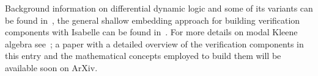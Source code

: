 \documentclass[11pt,a4paper]{article}
\begin{document}
Background information on differential dynamic logic and some of its variants can be found in~\cite{Platzer10,BohrerRVVP17}, the general shallow embedding approach for building verification components with Isabelle can be found in~\cite{ArmstrongGS16}. For more details on modal Kleene algebra see~\cite{DesharnaisS11}; a paper with a detailed overview of the verification components in this entry and the mathematical concepts employed to build them will be available soon on ArXiv.





\end{document}
